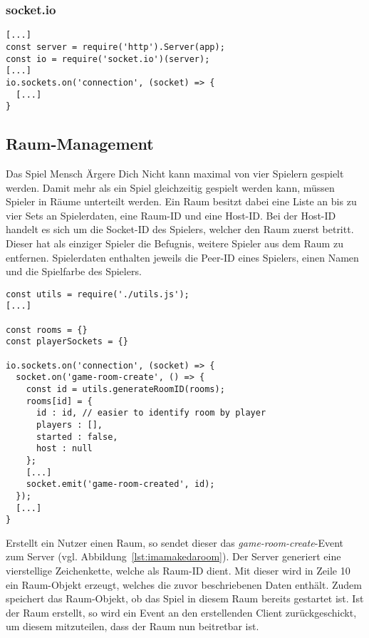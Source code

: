 \subsubsection{socket.io}

\vspace{11pt}
\lstset{language=js, style=STYLE_CODE_JS}
\begin{lstlisting}[caption={Initialisierung des socket.io Servers -- Server.js}, captionpos=b, label={lst:candidate}]
[...]
const server = require('http').Server(app);
const io = require('socket.io')(server);
[...]
io.sockets.on('connection', (socket) => {
  [...]
}
\end{lstlisting}

\subsection{Raum-Management}
Das Spiel \glqq{}Mensch Ärgere Dich Nicht\grqq{} kann maximal von vier Spielern gespielt werden. Damit mehr als ein Spiel gleichzeitig gespielt werden kann, müssen Spieler in \glqq{}Räume\grqq{} unterteilt werden. Ein Raum besitzt dabei eine Liste an bis zu vier Sets an Spielerdaten, eine Raum-ID und eine Host-ID. Bei der Host-ID handelt es sich um die Socket-ID des Spielers, welcher den Raum zuerst betritt. Dieser hat als einziger Spieler die Befugnis, weitere Spieler aus dem Raum zu entfernen. Spielerdaten enthalten jeweils die Peer-ID eines Spielers, einen Namen und die Spielfarbe des Spielers.

\vspace{11pt}
\lstset{language=js, style=STYLE_CODE_JS}
\begin{lstlisting}[caption={Event zum Erstellen eines Raums -- Server.js}, captionpos=b, label={lst:imamakedaroom}]
const utils = require('./utils.js');
[...]

const rooms = {}
const playerSockets = {}

io.sockets.on('connection', (socket) => {
  socket.on('game-room-create', () => {
    const id = utils.generateRoomID(rooms);
    rooms[id] = {
      id : id, // easier to identify room by player
      players : [],
      started : false,
      host : null
    };
    [...]	
    socket.emit('game-room-created', id);
  });
  [...]
}
\end{lstlisting}

Erstellt ein Nutzer einen Raum, so sendet dieser das \textit{game-room-create}-Event zum Server (vgl. Abbildung~\ref{lst:imamakedaroom}). Der Server generiert eine vierstellige Zeichenkette, welche als Raum-ID dient. Mit dieser wird in Zeile 10 ein Raum-Objekt erzeugt, welches die zuvor beschriebenen Daten enthält. Zudem speichert das Raum-Objekt, ob das Spiel in diesem Raum bereits gestartet ist. Ist der Raum erstellt, so wird ein Event an den erstellenden Client zurückgeschickt, um diesem mitzuteilen, dass der Raum nun beitretbar ist.\par

